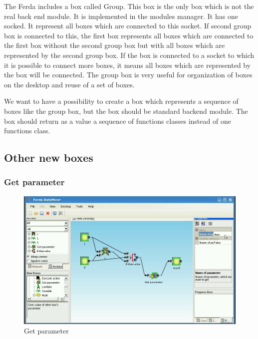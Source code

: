 \documentclass[a4paper,12pt]{book}
\begin{document}
The Ferda includes a box called Group. This box is the only box which is not the real back end module. It is implemented in the modules manager. It has one socked. It represent all boxes which are connected to this socket. If second group box is connected to this, the first box represents all boxes which are connected to the first box without the second group box but with all boxes which are represented by the second group box. If the box is connected to a socket to which it is possible to connect more boxes, it means all boxes which are represented by the box will be connected. The group box is very useful for organization of boxes on the desktop and reuse of a set of boxes.

We want to have a possibility to create a box which represents a sequence of boxes like the group box, but the box should be standard backend module. The box should return as a value a sequence of functions classes instead of one functions class.

\subsection{Other new boxes}
\subsubsection{Get parameter}
\begin{figure}
\includegraphics[width=13.72cm]{getParameter2.png}
	\caption{Get parameter}
\end{figure}
\end{document}

